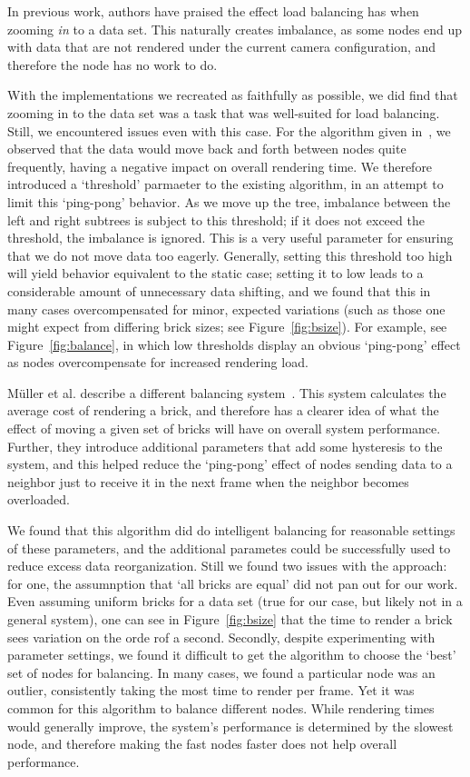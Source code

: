 In previous work, authors have praised the effect load balancing has
when
zooming \emph{in} to a data set.  This naturally creates imbalance, as
some nodes end up with data that are not rendered under the current
camera configuration, and therefore the node has no work to do.

With the implementations we recreated as faithfully as possible, we did
find that zooming in to the data set was a task that was well-suited
for load balancing.  Still, we encountered issues even with this case.
For the
algorithm given in~\cite{Marchesin:2006:???}, we observed that the
data would move back and forth between nodes quite frequently, having
a negative impact on overall rendering time.  We therefore introduced
a `threshold' parmaeter to the existing algorithm, in an attempt to
limit this `ping-pong' behavior.  As we move up the tree, imbalance
between the left and right subtrees is subject to this threshold; if
it does not exceed the threshold, the imbalance is ignored.  This
is a very useful parameter for ensuring that we do not move data
too eagerly.  Generally, setting this threshold too high will yield
behavior equivalent to the static case; setting it to low leads to a
considerable amount of unnecessary data shifting, and we found that
this in many cases overcompensated for minor, expected variations (such
as those one might expect
from differing brick sizes; see Figure~\ref{fig:bsize}).  For example,
see
Figure~\ref{fig:balance}, in which low thresholds display an obvious
`ping-pong' effect as nodes overcompensate for increased rendering
load.

M\"uller et al. describe a different balancing system~\cite{MSE06}.
This system calculates the average cost of rendering a brick, and
therefore has a clearer idea of what the effect of moving a given set
of bricks will have on overall system performance.  Further, they
introduce additional parameters that add some hysteresis to the system,
and this helped reduce the `ping-pong' effect of nodes sending data
to a neighbor just to receive it in the next frame when the neighbor
becomes overloaded.

We found that this algorithm did do intelligent balancing for
reasonable settings of these parameters, and the additional parametes
could be successfully used to reduce excess data reorganization.  Still
we found two issues with the approach: for one, the assumnption that
`all bricks are equal' did not pan out for our work.  Even assuming
uniform bricks for a data set (true for our case, but likely not in a
general system), one can see in
Figure~\ref{fig:bsize} that the time to render a brick sees variation
on the orde rof a second.  Secondly, despite experimenting with
parameter settings, we found it difficult to get the algorithm to
choose the `best' set of nodes for balancing.  In many cases, we found
a particular node was an outlier, consistently taking the most time
to render per frame.  Yet it was common for this algorithm to balance
different nodes.  While rendering times would generally improve, the
system's performance is determined by the slowest node, and therefore
making the fast nodes faster does not help overall performance.

